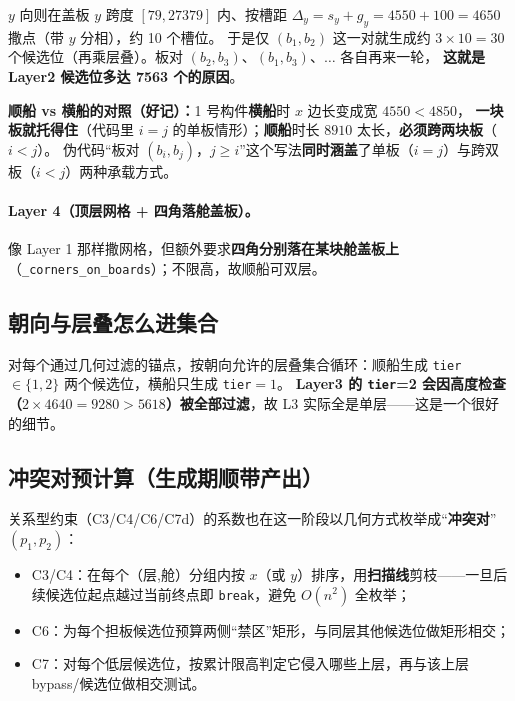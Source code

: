 \documentclass[11pt]{ctexart}
\newcommand{\code}[1]{\texttt{#1}}
\begin{document}
$y$ 向则在盖板 $y$ 跨度 $[79,27379]$ 内、按槽距 $\Delta_y=s_y+g_y=4550+100=4650$ 撒点（带 $y$ 分相），约 10 个槽位。
于是仅 $(b_1,b_2)$ 这一对就生成约 $3\times10=30$ 个候选位（再乘层叠）。板对 $(b_2,b_3)、(b_1,b_3)、\dots$ 各自再来一轮，
\textbf{这就是 Layer2 候选位多达 7563 个的原因}。

\begin{key}\textbf{顺船 vs 横船的对照（好记）：}1 号构件\textbf{横船}时 $x$ 边长变成宽 $4550<4850$，
\textbf{一块板就托得住}（代码里 $i{=}j$ 的单板情形）；\textbf{顺船}时长 $8910$ 太长，\textbf{必须跨两块板}（$i<j$）。
伪代码“板对 $(b_i,b_j)$，$j\ge i$”这个写法\textbf{同时涵盖}了单板（$i{=}j$）与跨双板（$i<j$）两种承载方式。
\end{key}

\paragraph{Layer 4（顶层网格 + 四角落舱盖板）。}像 Layer 1 那样撒网格，但额外要求\textbf{四角分别落在某块舱盖板上}（\code{\_corners\_on\_boards}）；不限高，故顺船可双层。

\subsection{朝向与层叠怎么进集合}
对每个通过几何过滤的锚点，按朝向允许的层叠集合循环：顺船生成 \code{tier}$\in\{1,2\}$ 两个候选位，横船只生成 \code{tier}$=1$。
\textbf{Layer3 的 \code{tier}=2 会因高度检查（$2\times4640=9280>5618$）被全部过滤}，故 L3 实际全是单层——这是一个很好的细节。

\subsection{冲突对预计算（生成期顺带产出）}
关系型约束（C3/C4/C6/C7d）的系数也在这一阶段以几何方式枚举成“\textbf{冲突对}”$(p_1,p_2)$：
\begin{itemize}[leftmargin=1.8em,itemsep=1pt]
  \item C3/C4：在每个（层,舱）分组内按 $x$（或 $y$）排序，用\textbf{扫描线}剪枝——一旦后续候选位起点越过当前终点即 \code{break}，避免 $O(n^2)$ 全枚举；
  \item C6：为每个担板候选位预算两侧“禁区”矩形，与同层其他候选位做矩形相交；
  \item C7：对每个低层候选位，按累计限高判定它侵入哪些上层，再与该上层 bypass/候选位做相交测试。
\end{itemize}
\end{document}

